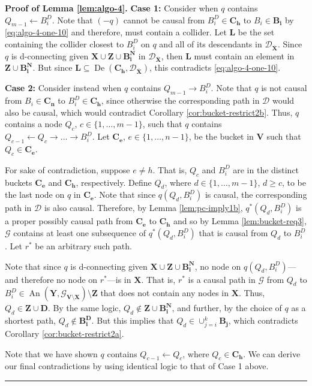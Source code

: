\documentclass[11pt]{article}
\DeclareMathOperator{\An}{An}
\DeclareMathOperator{\De}{De}
\newcommand{\BlackBox}{\rule{1.5ex}{1.5ex}}  %
\newcommand{\mb}[1]{\mathbf{#1}}
\newcommand{\g}[1][G]{\mathcal{#1}}
\newenvironment{proofof}[1][]{\noindent \textbf{Proof of #1.}}{\hfill\BlackBox}
\begin{document}
\begin{proofof}[Lemma \ref{lem:algo-4}]
    \textbf{Case 1:} 
    Consider when $q$ contains $Q_{m-1} \gets B_i^D$. Note that $(-q)$ cannot be causal from $B_i^D \in \mb{C_h}$ to $B_i \in \mb{B_i}$ by \eqref{eq:algo-4-one-10} and therefore, must contain a collider. Let $\mb{L}$ be the set containing the collider closest to $B_i^D$ on $q$ and all of its descendants in $\g[D]_{\overline{\mb{X}}}$. Since $q$ is d-connecting given $\mb{X} \cup \mb{Z} \cup \mb{B_i^N}$ in $\g[D]_{\overline{\mb{X}}}$, then $\mb{L}$ must contain an element in $\mb{Z} \cup \mb{B_i^N}$. But since $\mb{L} \subseteq \De(\mb{C_h},\g[D]_{\overline{\mb{X}}})$, this contradicts \eqref{eq:algo-4-one-10}.

    \textbf{Case 2:}
    Consider instead when $q$ contains $Q_{m-1} \to B_i^D$. Note that $q$ is not causal from $B_i \in \mb{C_n}$ to $B_i^D \in \mb{C_h}$, since otherwise the corresponding path in $\g[D]$ would also be causal, which would contradict Corollary \ref{cor:bucket-restrict2b}. Thus, $q$ contains a node $Q_c$, $c \in \{1, \dots, m-1\}$, such that $q$ contains $Q_{c-1} \gets Q_c \to \dots \to B_i^D$. Let $\mb{C_e}$, $e \in \{1, \dots, n-1\}$, be the bucket in $\mb{V}$ such that $Q_c \in \mb{C_e}$.

    For sake of contradiction, suppose $e \neq h$. That is, $Q_c$ and $B_i^D$ are in the distinct buckets $\mb{C_e}$ and $\mb{C_h}$, respectively. Define $Q_d$, where $d \in \{1, \dots, m-1\}$, $d \ge c$, to be the last node on $q$ in $\mb{C_e}$. Note that since $q(Q_d, B_i^D)$ is causal, the corresponding path in $\g[D]$ is also causal. Therefore, by Lemma \ref{lem:pc-imply1b}, $q^*(Q_d, B_i^D)$ is a proper possibly causal path from $\mb{C_e}$ to $\mb{C_h}$ and so by Lemma \ref{lem:bucket-req3}, $\g$ contains at least one subsequence of $q^*(Q_d, B_i^D)$ that is causal from $Q_d$ to $B_i^D$. Let $r^*$ be an arbitrary such path.

    Note that since $q$ is d-connecting given $\mb{X} \cup \mb{Z} \cup \mb{B_i^N}$, no node on $q(Q_d, B_i^D)$---and therefore no node on $r^*$---is in $\mb{X}$. That is, $r^*$ is a causal path in $\g$ from $Q_d$ to $B_i^D \in \An(\mb{Y}, \g_{\mb{V} \setminus \mb{X}}) \setminus \mb{Z}$ that does not contain any nodes in $\mb{X}$. Thus, $Q_d \in \mb{Z} \cup \mb{D}$. By the same logic, $Q_d \notin \mb{Z} \cup \mb{B_i^N}$, and further, by the choice of $q$ as a shortest path, $Q_d \notin \mb{B_i^D}$. But this implies that $Q_d \in \cup_{j=i}^{k} \mb{B_j}$, which contradicts Corollary \ref{cor:bucket-restrict2a}.

    Note that we have shown $q$ contains $Q_{c-1} \gets Q_c$, where $Q_c \in \mb{C_h}$. We can derive our final contradictions by using identical logic to that of Case 1 above.
        

\end{proofof}
\end{document}
